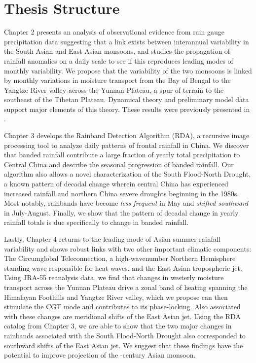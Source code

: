 \section{Thesis Structure}

	Chapter 2 presents an analysis of observational evidence from rain gauge precipitation data suggesting that a link exists between interannual variability in the South Asian and East Asian monsoons, and studies the propagation of rainfall anomalies on a daily scale to see if this reproduces leading modes of monthly variability. We propose that the variability of the two monsoons is linked by monthly variations in moisture transport from the Bay of Bengal to the Yangtze River valley across the Yunnan Plateau, a spur of terrain to the southeast of the Tibetan Plateau. Dynamical theory and preliminary model data support major elements of this theory. These results were previously presented in \citep{Day2015}.

	Chapter 3 develops the Rainband Detection Algorithm (RDA), a recursive image processing tool to analyze daily patterns of frontal rainfall in China. We discover that banded rainfall contribute a large fraction of yearly total precipitation to Central China and describe the seasonal progression of banded rainfall. Our algorithm also allows a novel characterization of the South Flood-North Drought, a known pattern of decadal change wherein central China has experienced increased rainfall and northern China severe droughts beginning in the 1980s. Most notably, rainbands have become \textit{less frequent} in May and \textit{shifted southward} in July-August. Finally, we show that the pattern of decadal change in yearly rainfall totals is due specifically to change in banded rainfall.

	Lastly, Chapter 4 returns to the leading mode of Asian summer rainfall variability and shows robust links with two other important climatic components: The Circumglobal Teleconnection, a high-wavenumber Northern Hemisphere standing wave responsible for heat waves, and the East Asian tropospheric jet. Using JRA-55 reanalysis data, we find that changes in westerly moisture transport across the Yunnan Plateau drive a zonal band of heating spanning the Himalayan Foothills and Yangtze River valley, which we propose can then stimulate the CGT mode and contributes to its phase-locking. Also associated with these changes are meridional shifts of the East Asian jet. Using the RDA catalog from Chapter 3, we are able to show that the two major changes in rainbands associated with the South Flood-North Drought also corresponded to southward shifts of the East Asian jet. We suggest that these findings have the potential to improve projection of the -century Asian monsoon. 

